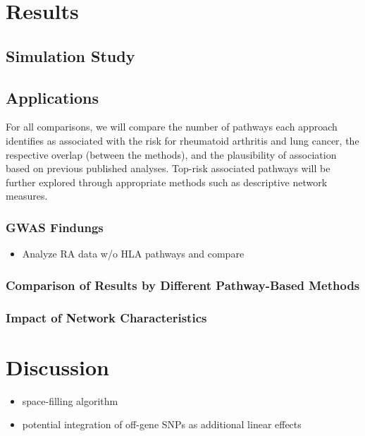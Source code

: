\documentclass[a4paper,10pt]{article}
\begin{document}
\section{Results}

\subsection{Simulation Study}

\subsection{Applications}

For all comparisons, we will compare the number of pathways each approach identifies as associated with the risk for rheumatoid arthritis and lung cancer, the respective overlap (between the methods), and the plausibility of association based on previous published analyses. 
Top-risk associated pathways will be further explored through appropriate methods such as descriptive network measures.

\subsubsection{GWAS Findungs}

\begin{itemize}
 \item Analyze RA data w/o HLA pathways and compare
\end{itemize}

\subsubsection{Comparison of Results by Different Pathway-Based Methods}

\subsubsection{Impact of Network Characteristics}

\section{Discussion}

\begin{itemize}
\item space-filling algorithm
 \item potential integration of off-gene SNPs as additional linear effects
\end{itemize}
\end{document}
